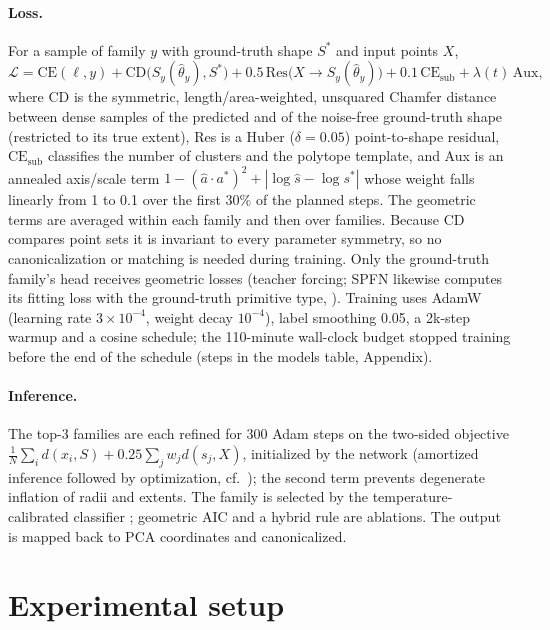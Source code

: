 \documentclass[10pt]{article}
\begin{document}
\paragraph{Loss.} For a sample of family $y$ with ground-truth shape $S^\ast$ and input points $X$,
\begin{equation}
\mathcal{L}=\mathrm{CE}(\ell,y)+\mathrm{CD}\big(S_y(\hat\theta_y),S^\ast\big)+0.5\,\mathrm{Res}\big(X\to S_y(\hat\theta_y)\big)+0.1\,\mathrm{CE}_{\mathrm{sub}}+\lambda(t)\,\mathrm{Aux},
\end{equation}
where CD is the symmetric, length/area-weighted, unsquared Chamfer distance \citep{fan2017pointset} between dense samples of the predicted and of the noise-free ground-truth shape (restricted to its true extent), Res is a Huber ($\delta=0.05$) point-to-shape residual, $\mathrm{CE}_{\mathrm{sub}}$ classifies the number of clusters and the polytope template, and Aux is an annealed axis/scale term $1-(\hat a\cdot a^\ast)^2+|\log\hat s-\log s^\ast|$ whose weight falls linearly from 1 to 0.1 over the first 30\% of the planned steps. The geometric terms are averaged within each family and then over families. Because CD compares point sets it is invariant to every parameter symmetry, so no canonicalization or matching is needed during training. Only the ground-truth family's head receives geometric losses (teacher forcing; SPFN likewise computes its fitting loss with the ground-truth primitive type, \citealp{li2019spfn}). Training uses AdamW (learning rate $3\times10^{-4}$, weight decay $10^{-4}$), label smoothing 0.05, a 2k-step warmup and a cosine schedule; the 110-minute wall-clock budget stopped training before the end of the schedule (steps in the models table, Appendix).

\paragraph{Inference.} The top-3 families are each refined for 300 Adam steps on the two-sided objective $\frac{1}{N}\sum_i d(x_i,S)+0.25\sum_j w_j d(s_j,X)$, initialized by the network (amortized inference followed by optimization, cf.\ \citealp{kolotouros2019spin}); the second term prevents degenerate inflation of radii and extents. The family is selected by the temperature-calibrated classifier \citep{guo2017calibration}; geometric AIC \citep{kanatani2004gaic} and a hybrid rule are ablations. The output is mapped back to PCA coordinates and canonicalized.

\section{Experimental setup}
\label{sec:setup}
\end{document}
